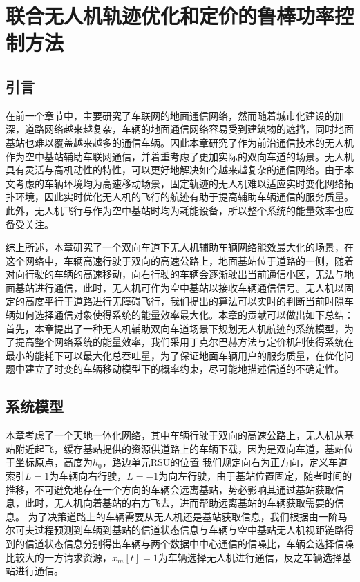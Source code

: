 \chapter{联合无人机轨迹优化和定价的鲁棒功率控制方法}

\label{chap:table}
\section{引言}\label{section4-1}
\label{chap:introduction}
在前一个章节中，主要研究了车联网的地面通信网络，然而随着城市化建设的加深，道路网络越来越复杂，车辆的地面通信网络容易受到建筑物的遮挡，同时地面基站也难以覆盖越来越多的通信车辆。因此本章研究了作为前沿通信技术的无人机作为空中基站辅助车联网通信，并着重考虑了更加实际的双向车道的场景。无人机具有灵活与高机动性的特性，可以更好地解决如今越来越复杂的通信网络。由于本文考虑的车辆环境均为高速移动场景，固定轨迹的无人机难以适应实时变化网络拓扑环境，因此实时优化无人机的飞行的航迹有助于提高辅助车辆通信的服务质量。此外，无人机飞行与作为空中基站时均为耗能设备，所以整个系统的能量效率也应备受关注。

综上所述，本章研究了一个双向车道下无人机辅助车辆网络能效最大化的场景，在这个网络中，车辆高速行驶于双向的高速公路上，地面基站位于道路的一侧，随着对向行驶的车辆的高速移动，向右行驶的车辆会逐渐驶出当前通信小区，无法与地面基站进行通信，此时，无人机可作为空中基站以接收车辆通信信号。无人机以固定的高度平行于道路进行无障碍飞行，我们提出的算法可以实时的判断当前时隙车辆如何选择通信对象使得系统的能量效率最大化。本章的贡献可以做出如下总结：首先，本章提出了一种无人机辅助双向车道场景下规划无人机航迹的系统模型，为了提高整个网络系统的能量效率，我们采用丁克尔巴赫方法与定价机制使得系统在最小的能耗下可以最大化总吞吐量，为了保证地面车辆用户的服务质量，在优化问题中建立了时变的车辆移动模型下的概率约束，尽可能地描述信道的不确定性。
\section{系统模型}\label{section4-2}
本章考虑了一个天地一体化网络，其中车辆行驶于双向的高速公路上，无人机从基站附近起飞，缓存基站提供的资源供道路上的车辆下载，因为是双向车道，基站位于坐标原点，高度为$h_0$，路边单元RSU的位置
我们规定向右为正方向，定义车道索引$L=1$为车辆向右行驶，$L=-1$为向左行驶，由于基站位置固定，随者时间的推移，不可避免地存在一个方向的车辆会远离基站，势必影响其通过基站获取信息，此时，无人机向着基站的右方飞去，进而帮助远离基站的车辆获取需要的信息。
为了决策道路上的车辆需要从无人机还是基站获取信息，我们根据由一阶马尔可夫过程预测到车辆到基站的信道状态信息与车辆与空中基站无人机视距链路得到的信道状态信息分别得出车辆与两个数据中中心通信的信噪比，车辆会选择信噪比较大的一方请求资源，$x_m\left[t\right]=1$为车辆选择无人机进行通信，反之车辆选择基站进行通信。

